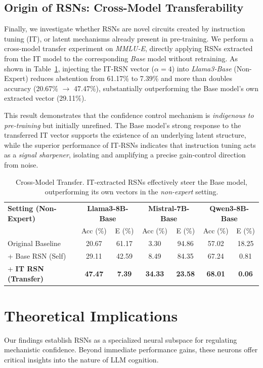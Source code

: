 \documentclass{article}
\begin{document}
\subsection{Origin of RSNs: Cross-Model Transferability}
\label{sec:origin-transfer}
Finally, we investigate whether RSNs are novel circuits created by instruction tuning (IT), or latent mechanisms already present in pre-training. We perform a cross-model transfer experiment on \emph{MMLU-E}, directly applying RSNs extracted from the IT model to the corresponding \emph{Base} model without retraining. As shown in Table~\ref{tab:transfer_base}, injecting the IT-RSN vector ($\alpha=4$) into \emph{Llama3-Base} (Non-Expert) reduces abstention from 61.17\% to 7.39\% and more than doubles accuracy (20.67\% $\to$ 47.47\%), substantially outperforming the Base model’s own extracted vector (29.11\%).

This result demonstrates that the confidence control mechanism is \emph{indigenous to pre-training} but initially unrefined. The Base model’s strong response to the transferred IT vector supports the existence of an underlying latent structure, while the superior performance of IT-RSNs indicates that instruction tuning acts as a \emph{signal sharpener}, isolating and amplifying a precise gain-control direction from noise.

\begin{table}[htbp]
\centering
\small
\caption{Cross-Model Transfer. IT-extracted RSNs effectively steer the Base model, outperforming its own vectors in the \emph{non-expert} setting.}
\label{tab:transfer_base}
\setlength{\tabcolsep}{4pt}
\begin{tabular}{l cc cc cc}
\toprule
\textbf{Setting (Non-Expert)} & \multicolumn{2}{c}{\textbf{Llama3-8B-Base}} & \multicolumn{2}{c}{\textbf{Mistral-7B-Base}} & \multicolumn{2}{c}{\textbf{Qwen3-8B-Base}} \\
& Acc (\%) & E (\%) & Acc (\%) & E (\%) & Acc (\%) & E (\%) \\
\midrule
Original Baseline & 20.67 & 61.17 & 3.30 & 94.86 & 57.02 & 18.25 \\
+ Base RSN (Self) & 29.11 & 42.59 & 8.49 & 84.35 & 67.24 & 0.81 \\
+ \textbf{IT RSN (Transfer)} & \textbf{47.47} & \textbf{7.39} & \textbf{34.33} & \textbf{23.58} & \textbf{68.01} & \textbf{0.06} \\
\bottomrule
\end{tabular}
\end{table}

\section{Theoretical Implications}
\label{sec:discussion}
Our findings establish RSNs as a specialized neural subspace for regulating mechanistic confidence. Beyond immediate performance gains, these neurons offer critical insights into the nature of LLM cognition.
\end{document}
